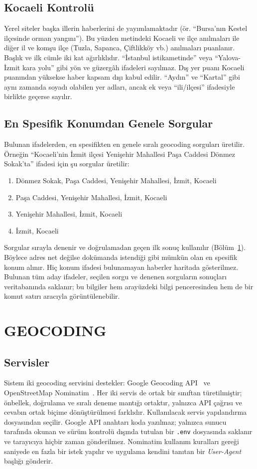 \documentclass[conference,a4paper]{IEEEtran}
\begin{document}
\subsection{Kocaeli Kontrolü}
Yerel siteler başka illerin haberlerini de yayımlamaktadır (ör. ``Bursa'nın Kestel
ilçesinde orman yangını''). Bu yüzden metindeki Kocaeli ve ilçe anılmaları ile
diğer il ve komşu ilçe (Tuzla, Sapanca, Çiftlikköy vb.) anılmaları puanlanır.
Başlık ve ilk cümle iki kat ağırlıklıdır. ``İstanbul istikametinde'' veya
``Yalova-İzmit kara yolu'' gibi yön ve güzergâh ifadeleri sayılmaz. Dış yer puanı
Kocaeli puanından yüksekse haber kapsam dışı kabul edilir. ``Aydın'' ve ``Kartal''
gibi aynı zamanda soyadı olabilen yer adları, ancak ek veya ``ili/ilçesi''
ifadesiyle birlikte geçerse sayılır.

\subsection{En Spesifik Konumdan Genele Sorgular}
Bulunan ifadelerden, en spesifikten en genele sıralı geocoding sorguları
üretilir. Örneğin ``Kocaeli'nin İzmit ilçesi Yenişehir Mahallesi Paşa Caddesi
Dönmez Sokak'ta'' ifadesi için şu sorgular üretilir:
\begin{enumerate}
\item Dönmez Sokak, Paşa Caddesi, Yenişehir Mahallesi, İzmit, Kocaeli
\item Paşa Caddesi, Yenişehir Mahallesi, İzmit, Kocaeli
\item Yenişehir Mahallesi, İzmit, Kocaeli
\item İzmit, Kocaeli
\end{enumerate}
Sorgular sırayla denenir ve doğrulamadan geçen ilk sonuç kullanılır
(Bölüm~\ref{sec:geocoding}). Böylece adres net değilse dokümanda istendiği gibi
mümkün olan en spesifik konum alınır. Hiç konum ifadesi bulunamayan haberler
haritada gösterilmez. Bulunan tüm aday ifadeler, seçilen sorgu ve denenen
sorguların sonuçları veritabanında saklanır; bu bilgiler hem arayüzdeki bilgi
penceresinden hem de bir komut satırı aracıyla görüntülenebilir.

\section{GEOCODING}\label{sec:geocoding}

\subsection{Servisler}
Sistem iki geocoding servisini destekler: Google Geocoding API~\cite{googlegeo}
ve OpenStreetMap Nominatim~\cite{nominatim}. Her iki servis de ortak bir sınıftan
türetilmiştir; önbellek, doğrulama ve sıralı deneme mantığı ortaktır, yalnızca
API çağrısı ve cevabın ortak biçime dönüştürülmesi farklıdır. Kullanılacak servis
yapılandırma dosyasından seçilir. Google API anahtarı koda yazılmaz; yalnızca
sunucu tarafında okunan ve sürüm kontrolü dışında tutulan bir \texttt{.env}
dosyasında saklanır ve tarayıcıya hiçbir zaman gönderilmez. Nominatim kullanım
kuralları gereği saniyede en fazla bir istek yapılır ve uygulama kendini tanıtan
bir \emph{User-Agent} başlığı gönderir.
\end{document}
